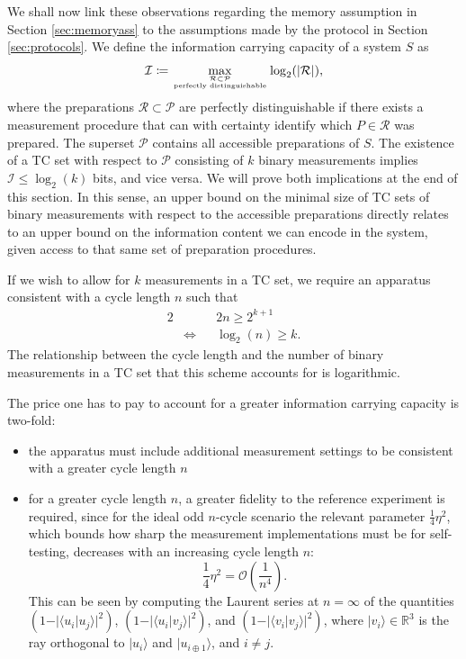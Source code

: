 We shall now link these observations regarding the memory assumption in Section \ref{sec:memoryass} to the assumptions made by the protocol in Section \ref{sec:protocols}.
We define the information carrying capacity of a system $S$ as 
\begin{equation*}
\mathcal{I}\coloneqq \max_{\mathcal{R}\subset \mathcal{P}\atop\text{perfectly distinguishable}}\log_2(\vert \mathcal{R} \vert),
\end{equation*}
where the preparations $\mathcal{R}\subset\mathcal{P}$ are perfectly distinguishable if there exists a measurement procedure that can with certainty identify which $P\in\mathcal{R}$ was prepared. The superset $\mathcal{P}$ contains all accessible preparations of $S$.
The existence of a TC set with respect to $\mathcal{P}$ consisting of $k$ binary measurements implies $\mathcal{I} \leq \log_2(k)$ bits, and vice versa. We will prove both implications at the end of this section. In this sense, an upper bound on the minimal size of TC sets of binary measurements with respect to the accessible preparations directly relates to an upper bound on the information content we can encode in the system, given access to that same set of preparation procedures. 

If we wish to allow for $k$ measurements in a TC set, we require an apparatus consistent with a cycle length $n$ such that
\begin{alignat*}{2}
& && 2n\geq 2^{k+1} \\
& \iff && \log_2(n)\geq k.
\end{alignat*}
The relationship between the cycle length and the number of binary measurements in a TC set that this scheme accounts for is logarithmic.

The price one has to pay to account for a greater information carrying capacity is two-fold:
\begin{itemize}
\item the apparatus must include additional measurement settings to be consistent with a greater cycle length $n$
\item for a greater cycle length $n$, a greater fidelity to the reference experiment is required, since for the ideal odd $n$-cycle scenario the relevant parameter $\frac{1}{4}\eta^2$, which bounds how sharp the measurement implementations must be for self-testing, decreases with an increasing cycle length $n$:
\begin{equation*}
\frac{1}{4}\eta^2 = \mathcal{O}\left(\frac{1}{n^4}\right).
\end{equation*}
This can be seen by computing the Laurent series at $n=\infty$ of the quantities $(1-\vert\langle u_i\vert u_j \rangle\vert^2)$, $(1-\vert\langle u_i\vert v_j \rangle\vert^2)$, and $(1-\vert\langle v_i\vert v_j \rangle\vert^2)$, where $\vert v_i \rangle\in\mathbb{R}^3$ is the ray orthogonal to $\vert u_i\rangle$ and $\vert u_{i\oplus 1}\rangle$, and $i\neq j$.
\end{itemize} 

